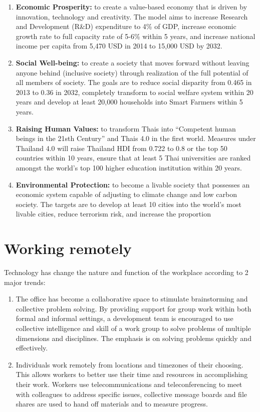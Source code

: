 \documentclass[]{book}
\providecommand{\tightlist}{%
  \setlength{\itemsep}{0pt}\setlength{\parskip}{0pt}}
\begin{document}
\begin{enumerate}
\def\labelenumi{\arabic{enumi}.}
\tightlist
\item
  \textbf{Economic Prosperity:} to create a value-based economy that is driven by innovation, technology and creativity. The model aims to increase Research and Development (R\&D) expenditure to 4\% of GDP, increase economic growth rate to full capacity rate of 5-6\% within 5 years, and increase national income per capita from 5,470 USD in 2014 to 15,000 USD by 2032.
\item
  \textbf{Social Well-being:} to create a society that moves forward without leaving anyone behind (inclusive society) through realization of the full potential of all members of society. The goals are to reduce social disparity from 0.465 in 2013 to 0.36 in 2032, completely transform to social welfare system within 20 years and develop at least 20,000 households into Smart Farmers within 5 years.
\item
  \textbf{Raising Human Values:} to transform Thais into ``Competent human beings in the 21sth Century'' and Thais 4.0 in the first world. Measures under Thailand 4.0 will raise Thailand HDI from 0.722 to 0.8 or the top 50 countries within 10 years, ensure that at least 5 Thai universities are ranked amongst the world's top 100 higher education institution within 20 years.
\item
  \textbf{Environmental Protection:} to become a livable society that possesses an economic system capable of adjusting to climate change and low carbon society. The targets are to develop at least 10 cities into the world's most livable cities, reduce terrorism risk, and increase the proportion
\end{enumerate}

\hypertarget{working-remotely}{%
\section{Working remotely}\label{working-remotely}}

Technology has change the nature and function of the workplace according to 2 major trends:

\begin{enumerate}
\def\labelenumi{\arabic{enumi}.}
\item
  The office has become a collaborative space to stimulate brainstorming and collective problem solving. By providing support for group work within both formal and informal settings, a development team is encouraged to use collective intelligence and skill of a work group to solve problems of multiple dimensions and disciplines. The emphasis is on solving problems quickly and effectively.
\item
  Individuals work remotely from locations and timezones of their choosing. This allows workers to better use their time and resources in accomplishing their work. Workers use telecommunications and teleconferencing to meet with colleagues to address specific issues, collective message boards and file shares are used to hand off materials and to measure progress.
\end{enumerate}
\end{document}
